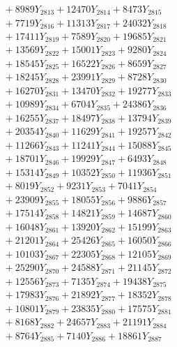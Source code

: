 \documentclass[a4paper,10pt]{article}
\begin{document}
{\begin{align}
&\;  + 8989 Y_{2813} + 12470 Y_{2814} + 8473 Y_{2815} \\[0.3ex]
&\;  + 7719 Y_{2816} + 11313 Y_{2817} + 24032 Y_{2818} \\[0.5ex]\allowbreak
&\;  + 17411 Y_{2819} + 7589 Y_{2820} + 19685 Y_{2821} \\[0.3ex]
&\;  + 13569 Y_{2822} + 15001 Y_{2823} + 9280 Y_{2824} \\[0.3ex]
&\;  + 18545 Y_{2825} + 16522 Y_{2826} + 8659 Y_{2827} \\[0.3ex]
&\;  + 18245 Y_{2828} + 23991 Y_{2829} + 8728 Y_{2830} \\[0.3ex]
&\;  + 16270 Y_{2831} + 13470 Y_{2832} + 19277 Y_{2833} \\[0.3ex]
&\;  + 10989 Y_{2834} + 6704 Y_{2835} + 24386 Y_{2836} \\[0.3ex]
&\;  + 16255 Y_{2837} + 18497 Y_{2838} + 13794 Y_{2839} \\[0.3ex]
&\;  + 20354 Y_{2840} + 11629 Y_{2841} + 19257 Y_{2842} \\[0.3ex]
&\;  + 11266 Y_{2843} + 11241 Y_{2844} + 15088 Y_{2845} \\[0.3ex]
&\;  + 18701 Y_{2846} + 19929 Y_{2847} + 6493 Y_{2848} \\[0.5ex]\allowbreak
&\;  + 15314 Y_{2849} + 10352 Y_{2850} + 11936 Y_{2851} \\[0.3ex]
&\;  + 8019 Y_{2852} + 9231 Y_{2853} + 7041 Y_{2854} \\[0.3ex]
&\;  + 23909 Y_{2855} + 18055 Y_{2856} + 9886 Y_{2857} \\[0.3ex]
&\;  + 17514 Y_{2858} + 14821 Y_{2859} + 14687 Y_{2860} \\[0.3ex]
&\;  + 16048 Y_{2861} + 13920 Y_{2862} + 15199 Y_{2863} \\[0.3ex]
&\;  + 21201 Y_{2864} + 25426 Y_{2865} + 16050 Y_{2866} \\[0.3ex]
&\;  + 10103 Y_{2867} + 22305 Y_{2868} + 12105 Y_{2869} \\[0.3ex]
&\;  + 25290 Y_{2870} + 24588 Y_{2871} + 21145 Y_{2872} \\[0.3ex]
&\;  + 12556 Y_{2873} + 7135 Y_{2874} + 19438 Y_{2875} \\[0.3ex]
&\;  + 17983 Y_{2876} + 21892 Y_{2877} + 18352 Y_{2878} \\[0.5ex]\allowbreak
&\;  + 10801 Y_{2879} + 23835 Y_{2880} + 17575 Y_{2881} \\[0.3ex]
&\;  + 8168 Y_{2882} + 24657 Y_{2883} + 21191 Y_{2884} \\[0.3ex]
&\;  + 8764 Y_{2885} + 7140 Y_{2886} + 18861 Y_{2887} \\[0.3ex]

\end{align}}
\end{document}
